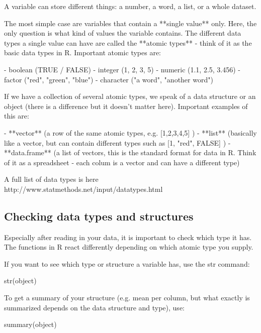 \documentclass[a4paper,twoside]{tufte-book}\usepackage[]{graphicx}\usepackage[]{color}
\begin{document}
{\begin{appendices}
A variable can store different things: a number, a word, a list, or a whole dataset. 

The most simple case are variables that contain a **single value** only. Here, the only question is what kind of values the variable contains. The different data types a single value can have are called the **atomic types** - think of it as the basic data types in R. Important atomic types are: 

- boolean (TRUE / FALSE)
- integer (1, 2, 3, 5)
- numeric (1.1, 2.5, 3.456)
- factor ("red", "green", "blue")
- character ("a word", "another word")

If we have a collection of several atomic types, we speak of a data structure or an object (there is a difference but it doesn't matter here). Important examples of this are: 

- **vector** (a row of the same atomic types, e.g. [1,2,3,4,5] )
- **list** (basically like a vector, but can contain different types such as [1, "red", FALSE] )
- **data.frame** (a list of vectors, this is the standard format for data in R. Think of it as a spreadsheet - each colum is a vector and can have a different type)

A full list of data types is here http://www.statmethods.net/input/datatypes.html 
 
\subsection{Checking data types and structures}

Especially after reading in your data, it is important to check which type it has. The functions in R react differently depending on which atomic type you supply. 

If you want to see which type or structure a variable has, use the str command:

\begin{Schunk}
\begin{Sinput}
str(object)
\end{Sinput}
\end{Schunk}

To get a summary of your structure (e.g. mean per column, but what exactly is summarized depends on the data structure and type), use:

\begin{Schunk}
\begin{Sinput}
summary(object)
\end{Sinput}
\end{Schunk}


\end{appendices}}
\end{document}
